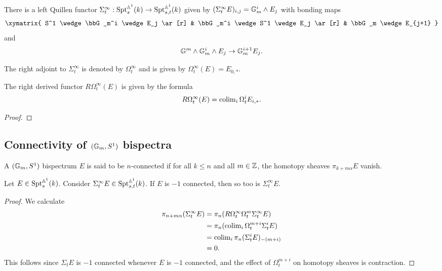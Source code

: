 \documentclass{amsart}%
\begin{document}
\begin{proposition}
  There is a left Quillen functor
  $\Sigma^{\infty}_t : \mathrm{Spt}_s^{\mathbb{A}^1}(k) \to \mathrm{Spt}_{s,t}^{\mathbb{A}^1}(k)$
  given by $(\Sigma^{\infty}_tE)_{i,j} = \mathbb{G}_m^i\wedge E_j$ with bonding maps 
  \begin{equation*}
    \xymatrix{
      S^1 \wedge \bbG_m^i \wedge E_j \ar[r] & \bbG_m^i \wedge S^1 \wedge E_j \ar[r] & \bbG_m \wedge E_{j+1}
    }
  \end{equation*}
  and 
  \begin{equation*}
    \mathbb{G}^m \wedge \mathbb{G}_m^i \wedge E_j \to \mathbb{G}_m^{i+1} E_j.
  \end{equation*}

  The right adjoint to $\Sigma^{\infty}_t$ is denoted by
  $\Omega^{\infty}_t$ and is given by
  $\Omega^{\infty}_t(E) = E_{0,*}$.

  The right derived functor $R\Omega^{\infty}_t(E)$ is given by the formula 
  \begin{equation*}
    R\Omega^{\infty}_t(E) = \operatorname{colim}_i \Omega_t^i E_{i,*}.
  \end{equation*}
\end{proposition}

\begin{proof}
  
\end{proof}

\subsection{Connectivity of $(\mathbb{G}_m, S^1)$ bispectra}

\begin{definition}
  A $(\mathbb{G}_m, S^1)$ bispectrum $E$ is said to be $n$-connected if for
  all $k\leq n$ and all $m \in \mathbb{Z}$, the homotopy sheaves
  $\pi_{k + m\alpha}E$ vanish.
\end{definition}

\begin{proposition}
  Let $E \in \mathrm{Spt}_s^{\mathbb{A}^1}(k)$. Consider
  $\Sigma^{\infty}_t E \in \mathrm{Spt}_{s,t}^{\mathbb{A}^1}(k)$. If $E$ is $-1$ connected,
  then so too is $\Sigma^{\infty}_t E$. 
\end{proposition}

\begin{proof}
  We calculate
  \begin{align*}
    \pi_{n+m\alpha}(\Sigma^{\infty}_t E) 
    & = \pi_n(R\Omega^{\infty}_t\Omega_t^m \Sigma^{\infty}_t E) \\ 
    & = \pi_n (\operatorname{colim}_i \Omega_t^{m+i}\Sigma_t^{i} E) \\
    & = \operatorname{colim}_i \pi_n (\Sigma_t^{i}E)_{-(m+i)}\\
    & = 0.
  \end{align*}
  This follows since $\Sigma_tE$ is $-1$ connected whenever $E$ is
  $-1$ connected, and the effect of $\Omega_t^{m+i}$ on homotopy
  sheaves is contraction.
\end{proof}
\end{document}
